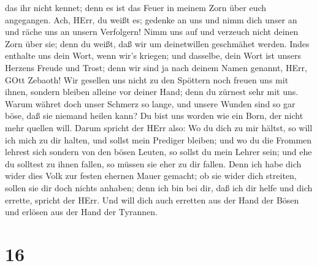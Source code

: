 das ihr nicht kennet; denn es ist das Feuer in meinem Zorn über euch
angegangen.  Ach, HErr, du weißt es; gedenke an uns und
nimm dich unser an und räche uns an unsern Verfolgern! Nimm uns auf und
verzeuch nicht deinen Zorn über sie; denn du weißt, daß wir um
deinetwillen geschmähet werden.  Indes enthalte uns dein
Wort, wenn wir's kriegen; und dasselbe, dein Wort ist unsers Herzens
Freude und Trost; denn wir sind ja nach deinem Namen genannt, HErr, GOtt
Zebaoth!  Wir gesellen uns nicht zu den Spöttern noch
freuen uns mit ihnen, sondern bleiben alleine vor deiner Hand; denn du
zürnest sehr mit uns.  Warum währet doch unser Schmerz so
lange, und unsere Wunden sind so gar böse, daß sie niemand heilen kann?
Du bist uns worden wie ein Born, der nicht mehr quellen will.
 Darum spricht der HErr also: Wo du dich zu mir hältst, so
will ich mich zu dir halten, und sollst mein Prediger bleiben; und wo du
die Frommen lehrest sich sondern von den bösen Leuten, so sollst du mein
Lehrer sein; und ehe du solltest zu ihnen fallen, so müssen sie eher zu
dir fallen.  Denn ich habe dich wider dies Volk zur festen
ehernen Mauer gemacht; ob sie wider dich streiten, sollen sie dir doch
nichts anhaben; denn ich bin bei dir, daß ich dir helfe und dich
errette, spricht der HErr.  Und will dich auch erretten aus
der Hand der Bösen und erlösen aus der Hand der Tyrannen.

\hypertarget{section-15}{%
\section{16}\label{section-15}}

